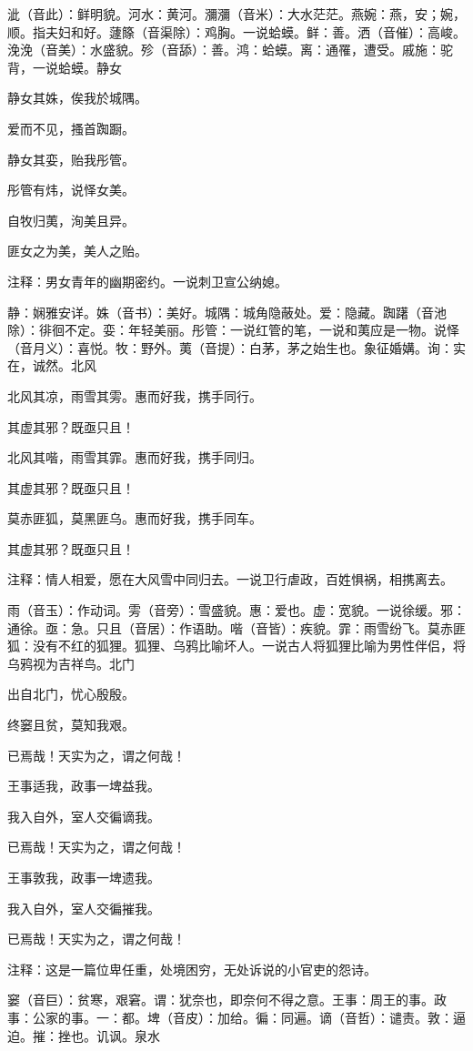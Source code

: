 \documentclass[12pt,UTF8]{ctexbook}
\begin{document}
泚（音此）：鲜明貌。河水：黄河。瀰瀰（音米）：大水茫茫。燕婉：燕，安；婉，顺。指夫妇和好。蘧篨（音渠除）：鸡胸。一说蛤蟆。鲜：善。洒（音催）：高峻。浼浼（音美）：水盛貌。殄（音舔）：善。鸿：蛤蟆。离：通罹，遭受。戚施：驼背，一说蛤蟆。静女

静女其姝，俟我於城隅。

爱而不见，搔首踟蹰。

静女其娈，贻我彤管。

彤管有炜，说怿女美。

自牧归荑，洵美且异。

匪女之为美，美人之贻。

注释：男女青年的幽期密约。一说刺卫宣公纳媳。

静：娴雅安详。姝（音书）：美好。城隅：城角隐蔽处。爱：隐藏。踟躇（音池除）：徘徊不定。娈：年轻美丽。彤管：一说红管的笔，一说和荑应是一物。说怿（音月义）：喜悦。牧：野外。荑（音提）：白茅，茅之始生也。象征婚媾。询：实在，诚然。北风

北风其凉，雨雪其雱。惠而好我，携手同行。

其虚其邪？既亟只且！

北风其喈，雨雪其霏。惠而好我，携手同归。

其虚其邪？既亟只且！

莫赤匪狐，莫黑匪乌。惠而好我，携手同车。

其虚其邪？既亟只且！

注释：情人相爱，愿在大风雪中同归去。一说卫行虐政，百姓惧祸，相携离去。

雨（音玉）：作动词。雱（音旁）：雪盛貌。惠：爱也。虚：宽貌。一说徐缓。邪：通徐。亟：急。只且（音居）：作语助。喈（音皆）：疾貌。霏：雨雪纷飞。莫赤匪狐：没有不红的狐狸。狐狸、乌鸦比喻坏人。一说古人将狐狸比喻为男性伴侣，将乌鸦视为吉祥鸟。北门

出自北门，忧心殷殷。

终窭且贫，莫知我艰。

已焉哉！天实为之，谓之何哉！

王事适我，政事一埤益我。

我入自外，室人交徧谪我。

已焉哉！天实为之，谓之何哉！

王事敦我，政事一埤遗我。

我入自外，室人交徧摧我。

已焉哉！天实为之，谓之何哉！

注释：这是一篇位卑任重，处境困穷，无处诉说的小官吏的怨诗。

窭（音巨）：贫寒，艰窘。谓：犹奈也，即奈何不得之意。王事：周王的事。政事：公家的事。一：都。埤（音皮）：加给。徧：同遍。谪（音哲）：谴责。敦：逼迫。摧：挫也。讥讽。泉水
\end{document}
